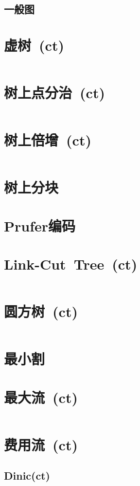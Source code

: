 	\subsection*{一般图}
\section{虚树\ \small(ct)}
	\inputminted{cpp}{GraphTheory/virtual_tree.cpp}
\section{树上点分治\ \small(ct)}
	\inputminted{cpp}{GraphTheory/divide_conquer_on_tree.cpp}
\section{树上倍增\ \small(ct)}
	\inputminted{cpp}{GraphTheory/multiplier_on_tree.cpp}
\section{树上分块}
\section{Prufer编码}
\section{Link-Cut\ Tree\ \small(ct)}
	\inputminted{cpp}{GraphTheory/link_cut_tree.cpp}
\section{圆方树\ \small(ct)}
	\inputminted{cpp}{GraphTheory/circle_square_tree.cpp}
\section{最小割}
\section{最大流\ \small(ct)}
	\inputminted{cpp}{GraphTheory/dinic.cpp}
\section{费用流\ \small(ct)}
	\subsection*{Dinic(ct)}
		\inputminted{cpp}{GraphTheory/min_cost_max_flow.cpp}
